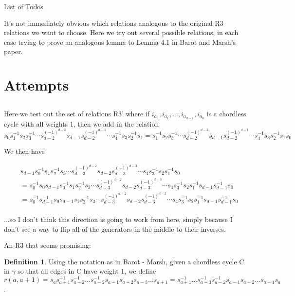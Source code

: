 \documentclass[11pt]{amsart}
\makeatletter
\theoremstyle{definition}
\newtheorem{defn}[thm]{Definition}
\def\listtodoname{List of Todos}
\def\listoftodos{\@starttoc{tdo}\listtodoname}
\makeatother
\begin{document}
\listoftodos
\newpage

It's not immediately obvious which relations analogous to the original R3 relations we want to choose.  Here we try out several possible relations, in each case trying to prove an analogous lemma to Lemma 4.1 in Barot and Marsh's paper.



\section{Attempts}

\subsection{}
Here we test out the set of relations R3' where if $i_{a_0}, i_{a_1},\ldots,i_{a_{d-1}},i_{a_0}$ is a chordless cycle with all weights 1, then we add in the relation 
$$s_0s_1^{-1}s_2s_3^{-1}\cdots s_{d-2}^{(-1)^{d-2}} s_{d-1}s_{d-2}^{(-1)^{d-1}}\cdots s_4^{-1}s_3s_2^{-1}s_1 = s_1^{-1}s_2s_3^{-1}\cdots s_{d-2}^{(-1)^{d-2}} s_{d-1}s_{d-2}^{(-1)^{d-1}}\cdots s_4^{-1}s_3s_2^{-1}s_1s_0$$


We then have

\begin{align*}
& s_{d-1}s_0^{-1}s_1s_2^{-1}s_3\cdots s_{d-3}^{(-1)^{d-2}} s_{d-2}s_{d-3}^{(-1)^{d-3}}\cdots s_4s_3^{-1}s_2s_1^{-1}s_0\\
&= s_0^{-1}s_0s_{d-1}s_0^{-1}s_1s_2^{-1}s_3\cdots s_{d-3}^{(-1)^{d-2}} s_{d-2}s_{d-3}^{(-1)^{d-3}}\cdots s_4s_3^{-1}s_2s_1^{-1}s_{d-1}s_{d-1}^{-1}s_0\\
&= s_0^{-1}s_{d-1}^{-1}s_0s_{d-1}s_1s_2^{-1}s_3\cdots s_{d-3}^{(-1)^{d-2}} s_{d-2}s_{d-3}^{(-1)^{d-3}}\cdots s_4s_3^{-1}s_2s_1^{-1}s_{d-1}s_{d-1}^{-1}s_0\\
\end{align*}


...so I don't think this direction is going to work from here, simply because I don't see a way to flip all of the generators in the middle to their inverses.

An R3 that seems promising:

\begin{defn}
Using the notation as in Barot - Marsh, given a chordless cycle C in $\gamma$ so that all edges in C have weight 1, we define $r(a, a+1) = s_{a}s_{a+1}^{-1}s_{a+2}^{-1}\dots s_{a-2}^{-1}s_{a-1}s_{a-2}s_{a-3}\dots s_{a+1} = s_{a+1}^{-1}\dots s_{a-3}^{-1}s_{a-2}^{-1}s_{a-1}s_{a-2}\dots s_{a+1}s_{a}$.
\end{defn}
\end{document}
